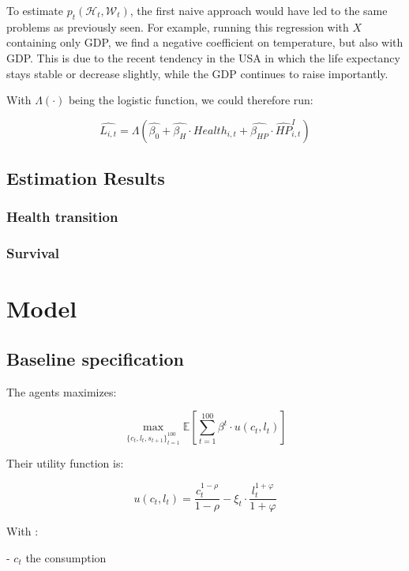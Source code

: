 \documentclass{article}
\begin{document}
To estimate $p_{t}(\mathcal{H}_{t},\mathcal{W}_{t})$,
the first naive approach would have led to the same 
problems as previously seen.
For example, running this regression with $X$ containing only GDP, 
we find a negative coefficient on temperature, but also with GDP. 
This is due to the recent tendency in the USA in which the life expectancy stays 
stable or decrease slightly, while the GDP continues to raise importantly.

With $\Lambda(\cdot)$ being the logistic
function, we could therefore run: 

\begin{equation}
    \widehat{L_{i,t}} = \Lambda \left( \widehat{\beta_0} +
    \widehat{\beta_{H}} \cdot Health_{i,t} +
    \widehat{\beta_{HP}} \cdot \widehat{HP}_{i,t}^{I}\right)
\end{equation}

\subsection{Estimation Results}



\subsubsection{Health transition}

\subsubsection{Survival}

\section{Model}

\subsection{Baseline specification }

The agents maximizes: 

$$ \max_{\{c_{t},l_{t},s_{t+1}\}_{t=1}^{100}}{\mathbb{E}\left[\sum_{t=1}^{100} \beta^{t}\cdot u(c_t,l_t)\right]}$$

Their utility function is: 

$$u(c_{t},l_{t}) = \frac{c_{t}^{1-\rho}}{1-\rho}-\xi_{t}\cdot \frac{l_{t}^{1+\varphi}}{1+\varphi}$$

With : 

-  $c_{t}$  the consumption
\end{document}
